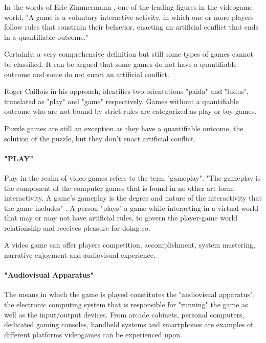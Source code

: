 \documentclass[a4paper,one side,12pt]{book}
\begin{document}
In the words of Eric Zimmermann \cite{zimmerman_2004_narrative}, one of the leading figures in the videogame world, "A game is a voluntary interactive activity, in which one or more players follow rules that constrain their behavior, enacting an artificial conflict that ends in a quantifiable outcome."

Certainly, a very comprehensive definition but still some types of games
cannot be classified. It can be argued that some games do not have a
quantifiable outcome and some do not enact an artificial conflict.

Roger Caillois in his approach\cite{caillois_2001_les}, identifies two orientations
"paida" and "ludus", translated as "play" and "game" respectively. Games
without a quantifiable outcome who are not bound by strict rules are
categorized as play or toy-games.

Puzzle games are still an exception as they have a quantifiable outcome,
the solution of the puzzle, but they don't enact artificial conflict.


\paragraph{"PLAY"}

Play in the realm of video games refers to the term "gameplay". "The
gameplay is the component of the computer games that is found in no
other art form: interactivity. A game's gameplay is the degree and
nature of the interactivity that the game includes" \cite{rouse_2005_game}. A person
"plays" a game while interacting in a virtual world that may or may not
have artificial rules, to govern the player-game world relationship and
receives pleasure for doing so.

A video game can offer players competition, accomplishment, system
mastering, narrative enjoyment and audiovisual experience. \cite{alainlediberder_1998_lunivers}


\paragraph{"Audiovisual Apparatus"}

The means in which the game is played constitutes the "audiovisual
apparatus", the electronic computing system that is responsible for
"running" the game as well as the input/output devices. From arcade
cabinets, personal computers, dedicated gaming consoles, handheld
systems and smartphones are examples of different platforms videogames
can be experienced upon.
\end{document}

